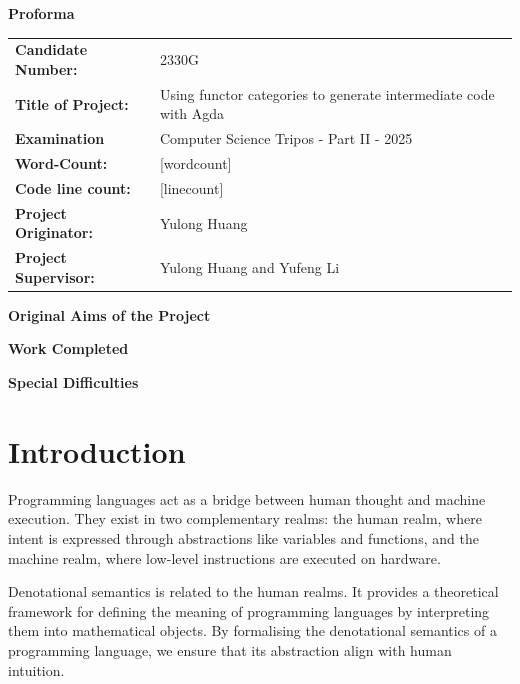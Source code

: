 \documentclass[12pt,twoside,a4paper]{report}
\theoremstyle{definition}
\theoremstyle{definition}
\theoremstyle{definition}
\theoremstyle{definition}
\begin{document}
\begin{titlepage}
    \vspace*{5em}
    \textbf{\LARGE Proforma}
    \vspace{2em}

    \begin{tabular}{ll}
        \textbf{Candidate Number:} & 2330G \\
        \textbf{Title of Project:} & Using functor categories to generate intermediate code with Agda \\
        \textbf{Examination} & Computer Science Tripos - Part II - 2025 \\
        \textbf{Word-Count:} & [wordcount] \\
        \textbf{Code line count:} & [linecount] \\
        \textbf{Project Originator:} & Yulong Huang \\
        \textbf{Project Supervisor:} & Yulong Huang and Yufeng Li \\
    \end{tabular}

    \vspace{2em}
    \textbf{\Large Original Aims of the Project}
    \vspace{1em}

    \vspace{2em}
    \textbf{\Large Work Completed}
    \vspace{1em}

    \vspace{2em}
    \textbf{\Large Special Difficulties}
    \vspace{1em}
\end{titlepage}

\tableofcontents
\newpage

\chapter{Introduction}
    \minitoc
    Programming languages act as a bridge between human thought and machine execution. They exist in two complementary realms: the human realm, where intent is expressed through abstractions like variables and functions, and the machine realm, where low-level instructions are executed on hardware. 

    Denotational semantics is related to the human realms. It provides a theoretical framework for defining the meaning of programming languages by interpreting them into mathematical objects. By formalising the denotational semantics of a programming language, we ensure that its abstraction align with human intuition. 
\end{document}
